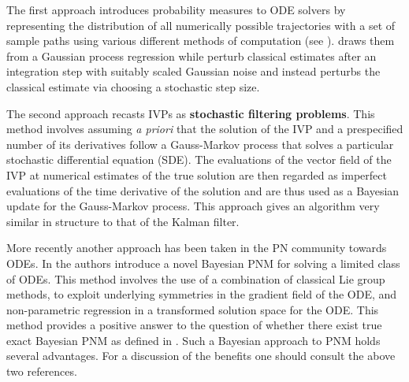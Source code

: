 The first approach introduces probability measures to ODE solvers by representing the distribution of all numerically possible trajectories with a set of sample paths using various different methods of computation (see \textcolor{blue}{\citep{chkrebtii2016bayesian,conrad2017statistical,teymur2016probabilistic,lie2019strong,abdulle2020random,teymur2018implicit}}). \textcolor{blue}{\citep{chkrebtii2016bayesian}} draws them from a Gaussian process regression while \textcolor{blue}{\citep{conrad2017statistical,teymur2016probabilistic,lie2019strong,teymur2018implicit}} perturb classical estimates after an integration step with suitably scaled Gaussian noise and \textcolor{blue}{\citep{abdulle2020random}} instead perturbs the classical estimate via choosing a stochastic step size.

The second approach \textcolor{blue}{\citep{schober2014probabilistic,kersting2016active,magnani2017bayesian,schober2019probabilistic,tronarp2019probabilistic,kersting2018convergence}} recasts IVPs as \textbf{stochastic filtering problems}. This method involves assuming \textit{a priori} that the solution of the IVP and a prespecified number of its derivatives follow a Gauss-Markov process that solves a particular stochastic differential equation (SDE). The evaluations of the vector field of the IVP at numerical estimates of the true solution are then regarded as imperfect evaluations of the time derivative of the solution and are thus used as a Bayesian update for the Gauss-Markov process. This approach gives an algorithm very similar in structure to that of the Kalman filter.

More recently another approach has been taken in the PN community towards ODEs. In \textcolor{blue}{\citep{wang2018role}} the authors introduce a novel Bayesian PNM for solving a limited class of ODEs. This method involves the use of a combination of classical Lie group methods, to exploit underlying symmetries in the gradient field of the ODE, and non-parametric regression in a transformed solution space for the ODE. This method provides a positive answer to the question of whether there exist true exact Bayesian PNM as defined in \textcolor{blue}{\citep{cockayne2019bayesian}}. Such a Bayesian approach to PNM holds several advantages. For a discussion of the benefits one should consult the above two references.

